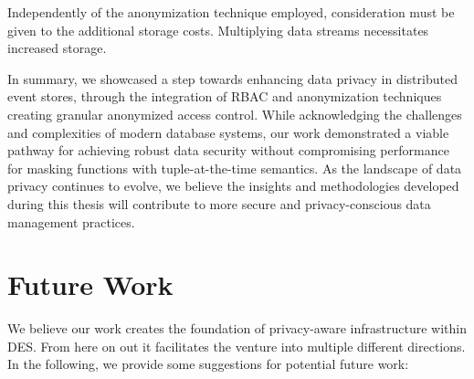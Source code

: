 Independently of the anonymization technique employed, consideration must be given to the additional storage costs. Multiplying data streams necessitates increased storage. \par 
In summary, we showcased a step towards enhancing data privacy in distributed event stores, through the integration of \ac{RBAC} and anonymization techniques creating granular anonymized access control. While acknowledging the challenges and complexities of modern database systems, our work demonstrated a viable pathway for achieving robust data security without compromising performance for masking functions with tuple-at-the-time semantics. As the landscape of data privacy continues to evolve, we believe the insights and methodologies developed during this thesis will contribute to more secure and privacy-conscious data management practices. 

\section{Future Work}
We believe our work creates the foundation of privacy-aware infrastructure within \ac{DES}. From here on out it facilitates the venture into multiple different directions. In the following, we provide some suggestions for potential future work:

